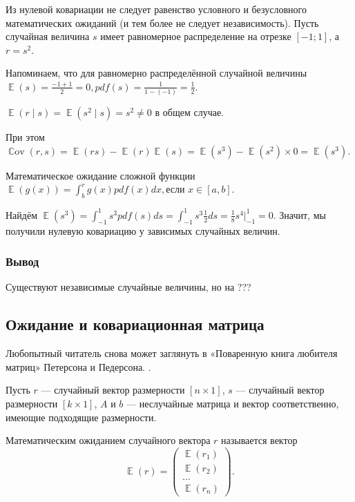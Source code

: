 \documentclass[12pt]{article}
\DeclareMathOperator{\Cov}{\mathbb{C}ov}
\DeclareMathOperator{\E}{\mathbb{E}}
\begin{document}
\begin{problem}
    Из нулевой ковариации не следует равенство условного и безусловного математических ожиданий (и тем более не следует независимость). Пусть случайная величина $s$ имеет равномерное распределение на отрезке $[-1; 1]$, а $r = s^2$.

    \begin{sol}

    Напоминаем, что для равномерно распределённой случайной величины \(\E(s) = \frac{-1+1}{2} = 0, pdf(s) = \frac{1}{1 - (-1)} = \frac{1}{2}.\)
    
    \(\E(r \mid s) = \E(s^2 \mid s) = s^2 \neq 0\) в общем случае.

    При этом \(\Cov(r, s) = \E(rs) - \E(r)\E(s) = \E(s^3) - \E(s^2) \times 0 = \E(s^3).\)

    Математическое ожидание сложной функции \( \E(g(x)) = \int^r_b g(x) pdf(x) dx, \text{если } x \in [a, b].\)
    
    Найдём \(\E(s^3) = \int^{1}_{-1} s^3 pdf(s) ds = \int^{1}_{-1} s^3 \frac{1}{2} ds = \frac{1}{8} s^4 | ^1_{-1} = 0.\) Значит, мы получили нулевую ковариацию у зависимых случайных величин.    
    \end{sol}
\end{problem}

\subsubsection*{Вывод}
Существуют независимые случайные величины, но на ???

\subsection{Ожидание и ковариационная матрица }

Любопытный читатель снова может заглянуть в  «Поваренную книга любителя матриц» Петерсона и Педерсона. \cite{petersen2012matrix}.

Пусть $r$ — случайный вектор размерности $[n \times 1]$, $s$ — случайный вектор размерности $[k \times 1]$, $A$ и $b$ — неслучайные матрица и вектор соответственно, имеющие подходящие размерности.

Математическим ожиданием случайного вектора $r$ называется вектор
\[
\E(r) = \begin{pmatrix}
	\E(r_1)  \\
	\E(r_2)  \\
        \dots \\
        \E(r_n)
      \end{pmatrix}.
\]
\end{document}
